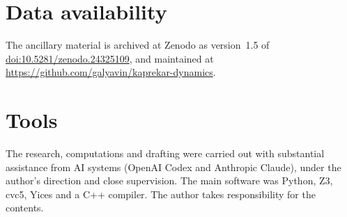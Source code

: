 \documentclass[11pt,reqno]{amsart}
\begin{document}
\section*{Data availability}
The ancillary material is archived at Zenodo as version~1.5 of \href{https://doi.org/10.5281/zenodo.24325109}{doi:10.5281/zenodo.24325109}, and maintained at \url{https://github.com/galyavin/kaprekar-dynamics}.

\section*{Tools}
The research, computations and drafting were carried out with substantial
assistance from AI systems (OpenAI Codex and Anthropic Claude), under the
author's direction and close supervision. The main software was Python,
Z3, cvc5, Yices and a C++ compiler. The author takes responsibility for
the contents.
\end{document}
